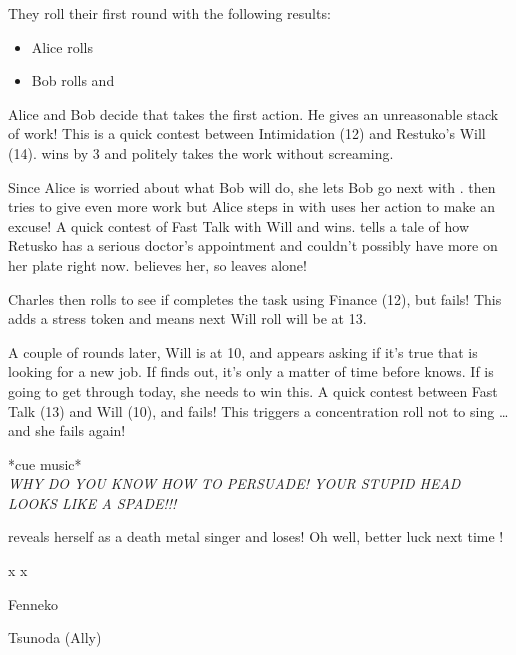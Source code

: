 \documentclass[onepage]{memoir}
\begin{document}
\begin{multicols}{2}
They roll their first round with the following results:
\begin{itemize}
\item Alice rolls \fenneko
\item Bob rolls \ton and \tsubone
\end{itemize}

Alice and Bob decide that \ton takes the first action. He  gives \retsuko an unreasonable stack of work! This is a quick contest between \tons Intimidation (12) and Restuko's Will (14). \retsuko wins by 3 and politely takes the work without screaming.

Since Alice is worried about what Bob will do, she lets Bob go next with \tsubone. \tsubone then tries to give \retsuko even more work but Alice steps in with \fenneko uses her action to make an excuse! A quick contest of \fennekos Fast Talk with \tsubones Will and \fenneko wins. \fenneko tells a tale of how Retusko has a serious doctor's appointment and couldn't possibly have more on her plate right now. \tsubone believes her, so leaves \retsuko alone!

Charles then rolls to see if \retsuko completes the task using Finance (12), but fails! This adds a stress token and means \retsukos next Will roll will be at 13.

A couple of rounds later, \retsukos Will is at 10, and \kabae appears asking if it's true that \retsuko is looking for a new job. If \kabae finds out, it's only a matter of time before \ton knows. If \retsuko is going to get through today, she needs to win this. A quick contest between \kabaes Fast Talk (13) and \retsukos Will (10), and \retsuko fails! This triggers a concentration roll not to sing \ldots{} and she fails again!

\begin{center}
  *cue music*\\
  \emph{WHY DO YOU KNOW HOW TO PERSUADE! YOUR STUPID HEAD LOOKS LIKE A SPADE!!!}
\end{center}
\retsuko reveals herself as a death metal singer and loses! Oh well, better luck next time \retsuko!
\end{multicols}
x \dotfill x 
\clearpage


\clearpage

\clearpage
\begin{card}{Fenneko}
  \ally
\end{card}
\begin{card}{Tsunoda (Ally)}
  \ally
\end{card}
\vfill
\end{document}
